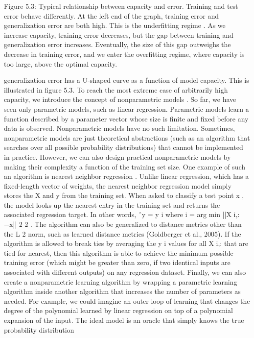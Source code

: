 \documentclass[11pt]{article}
\begin{document}
Figure 5.3: Typical relationship between capacity and error. Training and test error
behave diﬀerently. At the left end of the graph, training error and generalization error
are both high. This is the
underﬁtting regime
. As we increase capacity, training error
decreases, but the gap between training and generalization error increases. Eventually,
the size of this gap outweighs the decrease in training error, and we enter the
overﬁtting
regime, where capacity is too large, above the optimal capacity.

generalization error has a U-shaped curve as a function of model capacity. This is
illustrated in ﬁgure 5.3.
To reach the most extreme case of arbitrarily high capacity, we introduce
the concept of
nonparametric models
. So far, we have seen only parametric
models, such as linear regression. Parametric models learn a function described
by a parameter vector whose size is ﬁnite and ﬁxed before any data is observed.
Nonparametric models have no such limitation.
Sometimes, nonparametric models are just theoretical abstractions (such as
an algorithm that searches over all possible probability distributions) that cannot
be implemented in practice. However, we can also design practical nonparametric
models by making their complexity a function of the training set size. One example
of such an algorithm is
nearest neighbor regression
. Unlike linear regression,
which has a ﬁxed-length vector of weights, the nearest neighbor regression model
simply stores the
X
and
y
from the training set. When asked to classify a test
point
x
, the model looks up the nearest entry in the training set and returns the
associated regression target. In other words,
ˆy
=
y
i
where
i
=
arg min ||X
i,:
−x||
2
2
.
The algorithm can also be generalized to distance metrics other than the
L
2
norm,
such as learned distance metrics (Goldberger et al., 2005). If the algorithm is
allowed to break ties by averaging the
y
i
values for all
X
i,:
that are tied for nearest,
then this algorithm is able to achieve the minimum possible training error (which
might be greater than zero, if two identical inputs are associated with diﬀerent
outputs) on any regression dataset.
Finally, we can also create a nonparametric learning algorithm by wrapping a
parametric learning algorithm inside another algorithm that increases the number
of parameters as needed. For example, we could imagine an outer loop of learning
that changes the degree of the polynomial learned by linear regression on top of a
polynomial expansion of the input.
The ideal model is an oracle that simply knows the true probability distribution
\end{document}
